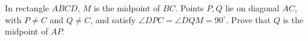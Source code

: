 In rectangle $ABCD$, $M$ is the midpoint of $BC$. Points $P,Q$ lie on diagonal $AC$, with $P\ne C$ and $Q\ne C$, and satisfy $\angle DPC=\angle DQM=90^\circ$. Prove that $Q$ is the midpoint of $AP$.
